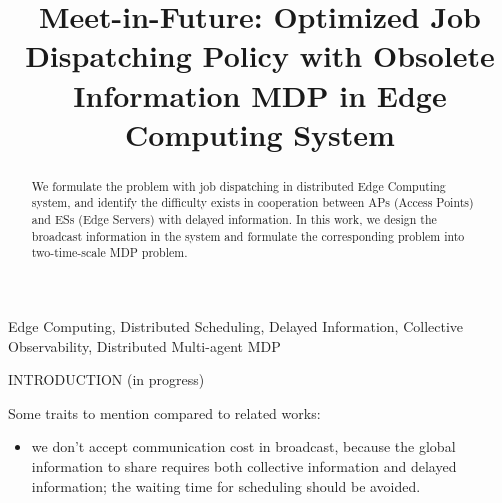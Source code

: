 \documentclass[10pt, conference, letterpaper]{IEEEtran}
\begin{document}
    \title{
        Meet-in-Future: Optimized Job Dispatching Policy with Obsolete Information MDP in Edge Computing System
    }
    \author{
    }
    \maketitle

    \begin{abstract}
        \label{sec:abstract}
        We formulate the problem with job dispatching in distributed Edge Computing system, and identify the difficulty exists in cooperation between APs (Access Points) and ESs (Edge Servers) with delayed information. In this work, we design the broadcast information in the system and formulate the corresponding problem into two-time-scale MDP problem.
    \end{abstract}

    \begin{IEEEkeywords}
        Edge Computing, Distributed Scheduling, Delayed Information, Collective Observability, Distributed Multi-agent MDP
    \end{IEEEkeywords}

    \begin{section}{INTRODUCTION}
        \label{sec:introduction}
        (in progress)

        Some traits to mention compared to related works:
        \begin{itemize}
            \item we don't accept communication cost in broadcast, because the global information to share requires both collective information and delayed information; the waiting time for scheduling should be avoided.
        \end{itemize}
    \end{section}
\end{document}
